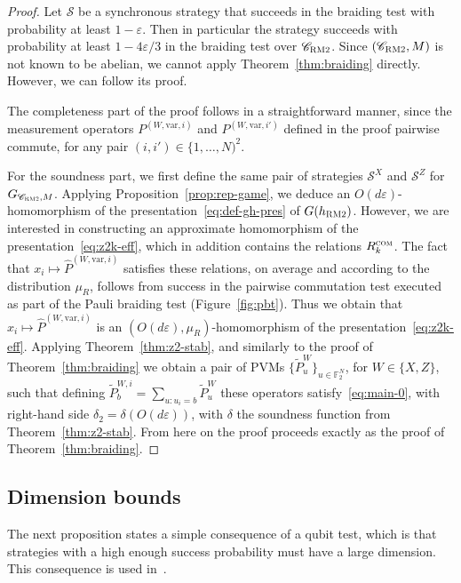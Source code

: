\documentclass[11pt]{article}
\theoremstyle{definition}
\newcommand{\code}{\mathscr{C}}
\newcommand{\strategy}{\mathscr{S}}
\newcommand{\F}{\ensuremath{\mathbb{F}}}
\newcommand{\com}{\textsc{com}}
\newcommand{\bRM}{\ensuremath{\textsc{RM2}}}
\newcommand{\eps}{\varepsilon}
\newcommand{\var}{\mathrm{var}}
\begin{document}
\begin{proof}
Let $\strategy$ be a synchronous strategy that succeeds in the braiding test with probability at least $1-\eps$. Then in particular the strategy succeeds with probability at least $1-4\eps/3$ in the braiding test over $\code_\bRM$. Since $(\code_\bRM,M)$ is not known to be abelian, we cannot apply Theorem~\ref{thm:braiding} directly. However, we can follow its proof. 

The completeness part of the proof follows in a straightforward manner, since the measurement operators $P^{(W,\var,i)}$ and $P^{(W,\var,i')}$ defined in the proof pairwise commute, for any pair $(i,i')\in \{1,\ldots,N)^2$. 

For the soundness part, we first define the same pair of strategies $\strategy^X$ and $\strategy^Z$ for $G_{\code_\bRM,M}$. Applying Proposition~\ref{prop:rep-game}, we deduce an $O(d\eps)$-homomorphism of the presentation~\eqref{eq:def-gh-pres} of $G(h_\bRM)$. However, we are interested in constructing an approximate homomorphism of the presentation~\eqref{eq:z2k-eff}, which in addition contains the relations $R_k^\com$. The fact that $x_i \mapsto \widehat{P}^{(W,\var,i)}$ satisfies these relations, on average and according to the distribution $\mu_R$, follows from success in the pairwise commutation test executed as part of the Pauli braiding test (Figure~\ref{fig:pbt}). Thus we obtain that $x_i \mapsto \widehat{P}^{(W,\var,i)}$ is an $(O(d\eps),\mu_R)$-homomorphism of the presentation~\eqref{eq:z2k-eff}. Applying Theorem~\ref{thm:z2-stab}, and similarly to the proof of Theorem~\ref{thm:braiding} we obtain a pair of PVMs $\{\tilde{P}^W_u\}_{u\in\F_2^N}$, for $W\in\{X,Z\}$, such that defining $\tilde{P}^{W,i}_b = \sum_{u:u_i=b} \tilde{P}^W_u$ these operators satisfy~\eqref{eq:main-0}, with right-hand side $\delta_2 = \delta(O(d\eps))$, with $\delta$ the soundness function from Theorem~\ref{thm:z2-stab}. From here on the proof proceeds exactly as the proof of Theorem~\ref{thm:braiding}. 
\end{proof}



\subsection{Dimension bounds}



The next proposition states a simple consequence of a qubit test, which is that strategies with a high enough success probability must have a large dimension. This consequence is used in~\cite{ji2020mip}. 
\end{document}
